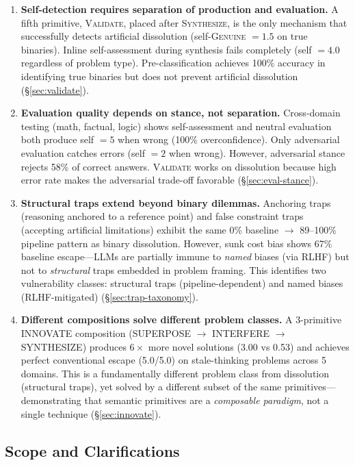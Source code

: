 \documentclass[11pt,a4paper]{article}
\begin{document}
\begin{enumerate}[leftmargin=*]
\item \textbf{Self-detection requires separation of production and evaluation.} A fifth primitive, \textsc{Validate}, placed after \textsc{Synthesize}, is the only mechanism that successfully detects artificial dissolution (self-\textsc{Genuine} $= 1.5$ on true binaries). Inline self-assessment during synthesis fails completely (self $= 4.0$ regardless of problem type). Pre-classification achieves 100\% accuracy in identifying true binaries but does not prevent artificial dissolution (\S\ref{sec:validate}).

\item \textbf{Evaluation quality depends on stance, not separation.} Cross-domain testing (math, factual, logic) shows self-assessment and neutral evaluation both produce self $= 5$ when wrong (100\% overconfidence). Only adversarial evaluation catches errors (self $= 2$ when wrong). However, adversarial stance rejects 58\% of correct answers. \textsc{Validate} works on dissolution because high error rate makes the adversarial trade-off favorable (\S\ref{sec:eval-stance}).

\item \textbf{Structural traps extend beyond binary dilemmas.} Anchoring traps (reasoning anchored to a reference point) and false constraint traps (accepting artificial limitations) exhibit the same 0\% baseline $\to$ 89--100\% pipeline pattern as binary dissolution. However, sunk cost bias shows 67\% baseline escape---LLMs are partially immune to \emph{named} biases (via RLHF) but not to \emph{structural} traps embedded in problem framing. This identifies two vulnerability classes: structural traps (pipeline-dependent) and named biases (RLHF-mitigated) (\S\ref{sec:trap-taxonomy}).

\item \textbf{Different compositions solve different problem classes.} A 3-primitive INNOVATE composition (SUPERPOSE $\to$ INTERFERE $\to$ SYNTHESIZE) produces $6\times$ more novel solutions (3.00 vs 0.53) and achieves perfect conventional escape (5.0/5.0) on stale-thinking problems across 5 domains. This is a fundamentally different problem class from dissolution (structural traps), yet solved by a different subset of the same primitives---demonstrating that semantic primitives are a \emph{composable paradigm}, not a single technique (\S\ref{sec:innovate}).
\end{enumerate}

\subsection{Scope and Clarifications}
\end{document}
